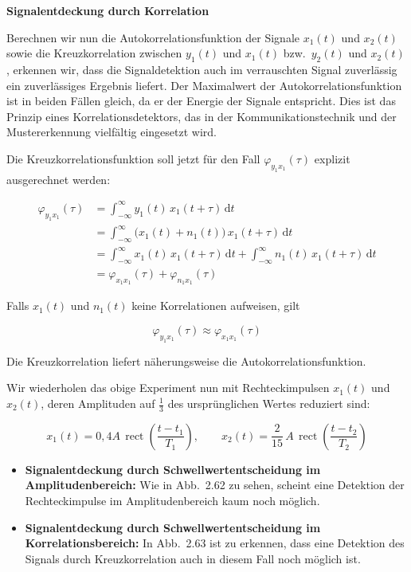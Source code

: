 \begin{beispiel}
\textbf{Signalentdeckung durch Korrelation}

Berechnen wir nun die Autokorrelationsfunktion der Signale $x_1(t)$ und $x_2(t)$ sowie die Kreuzkorrelation zwischen $y_1(t)$ und $x_1(t)$ bzw.\ $y_2(t)$ und $x_2(t)$, erkennen wir, dass die Signaldetektion auch im verrauschten Signal zuverlässig ein zuverlässiges Ergebnis liefert. Der Maximalwert der Autokorrelationsfunktion ist in beiden Fällen gleich, da er der Energie der Signale entspricht. Dies ist das Prinzip eines Korrelationsdetektors, das in der Kommunikationstechnik und der Mustererkennung vielfältig eingesetzt wird.

Die Kreuzkorrelationsfunktion soll jetzt für den Fall $\varphi_{y_1 x_1}(\tau)$ explizit ausgerechnet werden:

\begin{align*}
\varphi_{y_1 x_1}(\tau)
  &= \int_{-\infty}^{\infty} y_1(t)\, x_1(t+\tau)\,\mathrm{d}t \\
  &= \int_{-\infty}^{\infty} \bigl(x_1(t) + n_1(t)\bigr)\, x_1(t+\tau)\,\mathrm{d}t \\
  &= \int_{-\infty}^{\infty} x_1(t)\, x_1(t+\tau)\,\mathrm{d}t
     + \int_{-\infty}^{\infty} n_1(t)\, x_1(t+\tau)\,\mathrm{d}t \\
  &= \varphi_{x_1 x_1}(\tau) + \varphi_{n_1 x_1}(\tau)
\end{align*}

Falls $x_1(t)$ und $n_1(t)$ keine Korrelationen aufweisen, gilt

$$
\varphi_{y_1 x_1}(\tau) \approx \varphi_{x_1 x_1}(\tau)
$$

Die Kreuzkorrelation liefert näherungsweise die Autokorrelationsfunktion.


Wir wiederholen das obige Experiment nun mit Rechteckimpulsen $x_1(t)$ und $x_2(t)$, deren Amplituden auf $\tfrac{1}{3}$ des ursprünglichen Wertes reduziert sind:

$$
x_1(t) = 0{,}4A\,\operatorname{rect}\!\left(\frac{t - t_1}{T_1}\right), \qquad
x_2(t) = \frac{2}{15}\,A\,\operatorname{rect}\!\left(\frac{t - t_2}{T_2}\right)
$$

\begin{itemize}
  \item \textbf{Signalentdeckung durch Schwellwertentscheidung im Amplitudenbereich:} Wie in Abb.\ 2.62 zu sehen, scheint eine Detektion der Rechteckimpulse im Amplitudenbereich kaum noch möglich.
  \item \textbf{Signalentdeckung durch Schwellwertentscheidung im Korrelationsbereich:} In Abb.\ 2.63 ist zu erkennen, dass eine Detektion des Signals durch Kreuzkorrelation auch in diesem Fall noch möglich ist.
\end{itemize}

\end{beispiel}

